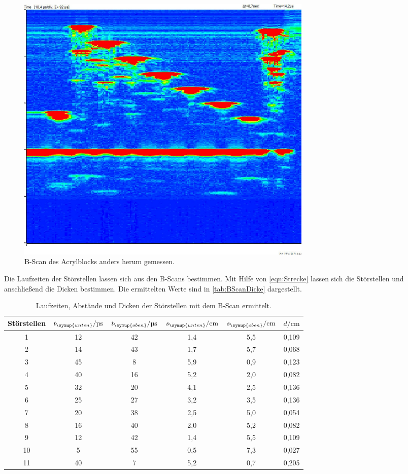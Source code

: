 \begin{figure}
  \centering
  \includegraphics[width=0.7\textwidth]{messwerte/BScanAcrylBlock/umgedreht.jpg}
  \caption{B-Scan des Acrylblocks anders herum gemessen.}
  \label{fig:Acryl2}
\end{figure}
Die Laufzeiten der Störstellen lassen sich aus den B-Scans bestimmen. Mit Hilfe von \autoref{eqn:Strecke} lassen
sich die Störstellen und anschließend die Dicken bestimmen. Die ermittelten Werte sind in \autoref{tab:BScanDicke}
dargestellt.
\begin{table}
  \centering
  \begin{tabular}{c c c c c c}
    \toprule
    Störstellen & $t_{\symup{unten}}/\unit{\micro\second}$ & $t_{\symup{oben}}/\unit{\micro\second}$ & $s_{\symup{unten}}/\unit{\centi\meter}$ & $s_{\symup{oben}}/\unit{\centi\meter}$ & $d/\unit{\centi\meter}$ \\
    \midrule
     1 & 12 & 42 & 1,4 & 5,5 & 0,109 \\
     2 & 14 & 43 & 1,7 & 5,7 & 0,068 \\
     3 & 45 &  8 & 5,9 & 0,9 & 0,123 \\
     4 & 40 & 16 & 5,2 & 2,0 & 0,082 \\
     5 & 32 & 20 & 4,1 & 2,5 & 0,136 \\
     6 & 25 & 27 & 3,2 & 3,5 & 0,136 \\
     7 & 20 & 38 & 2,5 & 5,0 & 0,054 \\
     8 & 16 & 40 & 2,0 & 5,2 & 0,082 \\
     9 & 12 & 42 & 1,4 & 5,5 & 0,109 \\
    10 &  5 & 55 & 0,5 & 7,3 & 0,027 \\
    11 & 40 &  7 & 5,2 & 0,7 & 0,205 \\
    \bottomrule
  \end{tabular}
  \caption{Laufzeiten, Abstände und Dicken der Störstellen mit dem B-Scan ermittelt.}
  \label{tab:BScanDicke}
\end{table}

